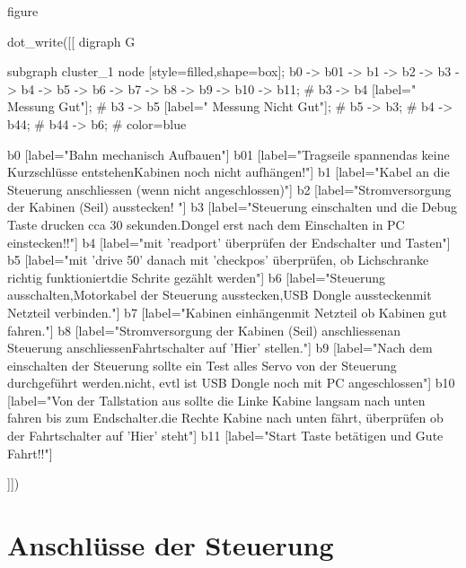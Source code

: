 \documentclass{article}
\begin{document}
\begin{nofloat}{figure}
        \centering
\begin{luacode*}
  dot_write([[ digraph G {

    subgraph cluster_1 {
    node [style=filled,shape=box];
    b0 -> b01 -> b1  -> b2 -> b3 -> b4 -> b5 -> b6 -> b7 -> b8 -> b9 -> b10 -> b11;
#    b3 -> b4 [label="  Messung Gut"];
#    b3 -> b5 [label="  Messung Nicht Gut"];
#    b5 -> b3;
#    b4 -> b44;
#    b44 -> b6;
#    color=blue
  }
  
  b0 [label="Bahn mechanisch Aufbauen"]
  b01 [label="Tragseile spannen\nBeachten das keine Kurzschlüsse entstehen\n Kabinen noch nicht aufhängen!"]
  b1 [label="Kabel an die Steuerung anschliessen (wenn nicht angeschlossen)"]
  b2 [label="Stromversorgung der Kabinen (Seil) ausstecken! "]
  b3 [label="Steuerung einschalten und die Debug Taste drucken cca 30 sekunden.\nUSB Dongel erst nach dem Einschalten in PC einstecken!!"]
  b4 [label="mit 'readport' überprüfen der Endschalter und Tasten"]
  b5 [label="mit 'drive 50' danach mit 'checkpos' überprüfen, ob Lichschranke richtig funktioniert\nund die Schrite gezählt werden"]
  b6 [label="Steuerung ausschalten,Motorkabel der Steuerung ausstecken,USB Dongle ausstecken\nMotoren mit Netzteil verbinden."]
  b7 [label="Kabinen einhängen mit Netzteil ob Kabinen gut fahren."]
  b8 [label="Stromversorgung der Kabinen (Seil) anschliessen\nMotoren an Steuerung anschliessen\nden Fahrtschalter auf 'Hier' stellen."]
  b9 [label="Nach dem einschalten der Steuerung sollte ein Test alles Servo von der Steuerung durchgeführt werden.\nWenn nicht, evtl ist USB Dongle noch mit PC angeschlossen"]
  b10 [label="Von der Tallstation aus sollte die Linke Kabine langsam nach unten fahren bis zum Endschalter.\nWenn die Rechte Kabine nach unten fährt, überprüfen ob der Fahrtschalter auf 'Hier' steht"]
  b11 [label="Start Taste betätigen und Gute Fahrt!!"]
  
  
  
}
]])

\end{luacode*}
\caption{Ablauf der Installation, folgend Details zu der Installation}
        \label{fig:mess}
\end{nofloat}







\section{Anschlüsse der Steuerung}
\end{document}
